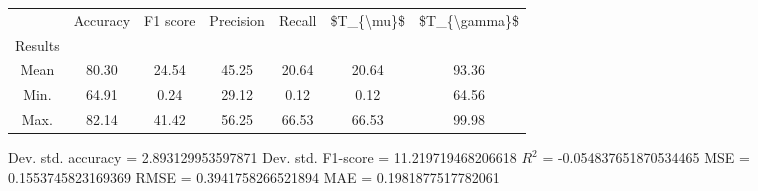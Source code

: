 \begin{tabular}{|c|c|c|c|c|c|c|}
\toprule
{} &  Accuracy &  F1 score &  Precision &  Recall &  \$T\_\{\textbackslash mu\}\$ &  \$T\_\{\textbackslash gamma\}\$ \\
Results &           &           &            &         &            &               \\
\hline
Mean    &     80.30 &     24.54 &      45.25 &   20.64 &      20.64 &         93.36 \\
Min.    &     64.91 &      0.24 &      29.12 &    0.12 &       0.12 &         64.56 \\
Max.    &     82.14 &     41.42 &      56.25 &   66.53 &      66.53 &         99.98 \\
\bottomrule
\end{tabular}

 Dev. std. accuracy = 2.893129953597871
 Dev. std. F1-score = 11.219719468206618
 $R^2$ = -0.054837651870534465
 MSE = 0.1553745823169369
 RMSE = 0.3941758266521894
 MAE = 0.1981877517782061
